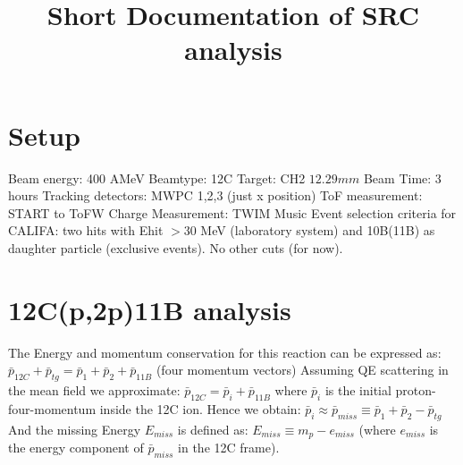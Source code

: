 \documentclass{report}
\title{Short Documentation of SRC analysis}
\begin{document}
\maketitle

\section{Setup}
Beam energy: 400 AMeV\newline
Beamtype: 12C\newline
Target: CH2 $12.29mm$\newline
Beam Time: 3 hours\newline
Tracking detectors: MWPC 1,2,3 (just x position)\newline
ToF measurement: START to ToFW\newline
Charge Measurement: TWIM Music\newline
Event selection criteria for CALIFA: two hits with E\textunderscore hit $> 30$ MeV (laboratory system) and 10B(11B) as daughter particle (exclusive events).\newline
No other cuts (for now).\newline

\section{12C(p,2p)11B analysis}
The Energy and momentum conservation for this reaction can be expressed as:\newline
$\bar{p}_{12C} + \bar{p}_{tg} = \bar{p}_{1} + \bar{p}_{2} + \bar{p}_{11B}$ (four momentum vectors) \newline
Assuming QE scattering in the mean field we approximate:\newline
$\bar{p}_{12C} = \bar{p}_{i} + \bar{p}_{11B}$ where $\bar{p}_{i}$ is the initial proton-four-momentum inside the 12C ion.\newline
Hence we obtain:\newline
$\bar{p}_{i} \approx \bar{p}_{miss} \equiv \bar{p}_{1} + \bar{p}_{2} - \bar{p}_{tg}$ \newline
And the missing Energy $E_{miss}$ is defined as:\newline
$E_{miss} \equiv m_{p} - e_{miss}$ (where $e_{miss}$ is the energy component of $\bar{p}_{miss}$ in the 12C frame).\newline
\end{document}
